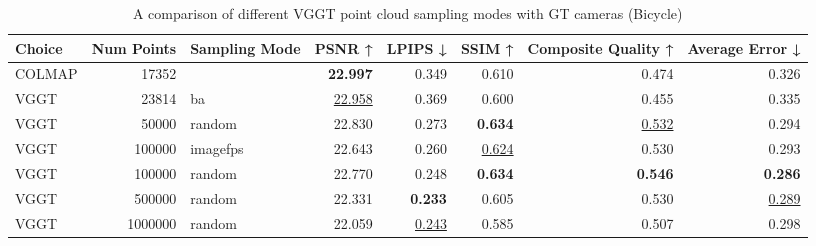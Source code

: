 \begin{table}[H]
\caption{\ifdefined\customcaption \customcaption \else A comparison of different VGGT point cloud sampling modes with GT cameras (Bicycle) \fi}
\label{tab:03_sampling_mode_gt_cams_bicycle}
\centering
\scriptsize
\begin{tabular}{lrlrrrrr}
\toprule
Choice & Num Points & Sampling Mode & PSNR ↑ & LPIPS ↓ & SSIM ↑ & Composite Quality ↑ & Average Error ↓ \\
\midrule
COLMAP & 17352 &  & \textbf{22.997} & 0.349 & 0.610 & 0.474 & 0.326 \\
VGGT & 23814 & ba & \underline{22.958} & 0.369 & 0.600 & 0.455 & 0.335 \\
VGGT & 50000 & random & 22.830 & 0.273 & \textbf{0.634} & \underline{0.532} & 0.294 \\
VGGT & 100000 & imagefps & 22.643 & 0.260 & \underline{0.624} & 0.530 & 0.293 \\
VGGT & 100000 & random & 22.770 & 0.248 & \textbf{0.634} & \textbf{0.546} & \textbf{0.286} \\
VGGT & 500000 & random & 22.331 & \textbf{0.233} & 0.605 & 0.530 & \underline{0.289} \\
VGGT & 1000000 & random & 22.059 & \underline{0.243} & 0.585 & 0.507 & 0.298 \\
\bottomrule
\end{tabular}
\end{table}